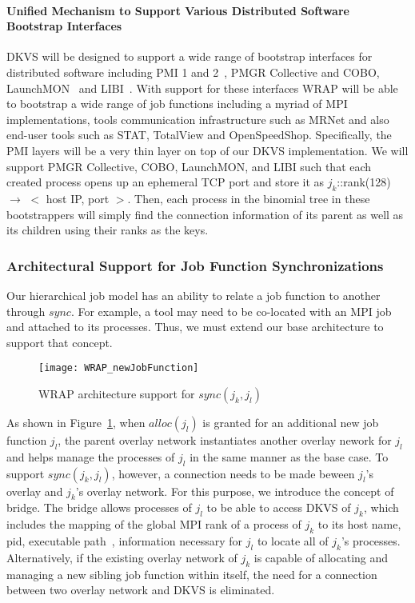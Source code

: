 \paragraph{Unified Mechanism to Support Various Distributed Software Bootstrap Interfaces}
\label{sect:bootstrap}

DKVS will be designed to support a wide range of bootstrap interfaces
for distributed software including PMI 1 and 2~\cite{PMI2}, PMGR Collective and COBO,
LaunchMON~\cite{launchmon} and LIBI~\cite{libi}. With support for these interfaces
WRAP will be able to bootstrap a wide range of job functions including a myriad of
MPI implementations, tools communication infrastructure such as MRNet
and also end-user tools such as STAT, TotalView and OpenSpeedShop.
Specifically, the PMI layers will be a very thin layer on top
of our DKVS implementation. We will support PMGR Collective,
COBO, LaunchMON, and LIBI such that each created process opens
up an ephemeral TCP port and store it as $j_k$::rank(128) $\rightarrow$ $<$ host IP, port $>$.
Then, each process in the binomial tree in these bootstrappers
will simply find the connection information of its parent as well as
its children using their ranks as the keys.

\subsubsection{Architectural Support for Job Function Synchronizations}
\label{sect:sync}
Our hierarchical job model has an ability to relate a job function
to another through $sync$.
For example, a tool may need to be co-located with an MPI job
and attached to its processes.
Thus, we must extend our base architecture to support that concept.
\begin{figure}
  \centering
    \texttt{[image: WRAP\_newJobFunction]}
  \caption{WRAP architecture support for ${sync(j_k, j_l)}$}
  \label{syncext}
\end{figure}
As shown in Figure~\ref{syncext}, when $alloc(j_l)$
is granted for an additional new job function $j_l$,
the parent overlay network instantiates
another overlay nework for $j_l$ and helps manage
the processes of $j_l$ in the same manner as the base case.
To support ${sync(j_k, j_l)}$,
however, a connection needs to be made beween $j_l$'s
overlay and $j_k$'s overlay network.
For this purpose, we introduce the concept
of bridge. The bridge allows processes
of $j_l$ to be able to access DKVS of $j_k$, which includes
the mapping of the global MPI rank of a process of $j_k$
to its host name, pid, executable path~\cite{MPIRInterface},
information necessary for $j_l$ to locate all of $j_k$'s processes.
Alternatively, if the existing overlay network of $j_k$ is
capable of allocating and managing a new sibling job function
within itself, the need for a connection between two overlay
network and DKVS is eliminated.

